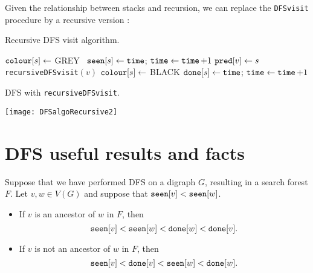 Given the relationship between stacks and recursion, we can replace the \texttt{DFSvisit} procedure by
a recursive version : 

\begin{algorithm}[H]
  \caption{Recursive DFS visit algorithm.}
    \label{alg:DFSreccode}
\begin{algorithmic}[1]
	\State $\colour[s] \gets $ GREY \
	\State $\seen[s] \gets \timeVar$; $\timeVar \gets \timeVar + 1$
		 
			\State $\pred[v] \gets s$ 
			\State \texttt{recursiveDFSvisit}$(v)$ 
		\EndIf
	\EndFor
	\State $\colour[s] \gets $ BLACK 
	\State $\done[s] \gets \timeVar $; $\timeVar \gets \timeVar + 1$
\EndFunction
\end{algorithmic}
\end{algorithm}

\begin{Boxample}
DFS with \texttt{recursiveDFSvisit}. 
\begin{center}
  \texttt{[image: DFSalgoRecursive2]}
\end{center}
\end{Boxample}

\section{DFS useful results and facts}
\begin{Theorem}
\label{thm:DFS-seen-done}
Suppose that we have performed DFS on a digraph $G$, resulting in a 
search forest $F$. Let $v, w \in V(G)$ and suppose that $\seen[v] < \seen[w]$. 

\begin{itemize}
\item
If $v$ is an ancestor of $w$ in $F$, then 
$$\seen[v] < \seen[w] < \done[w] < \done[v].$$
\item
If $v$ is not an ancestor of $w$ in $F$, then
$$\seen[v] < \done[v]  < \seen[w] < \done[w].$$
\end{itemize}
\end{Theorem}

